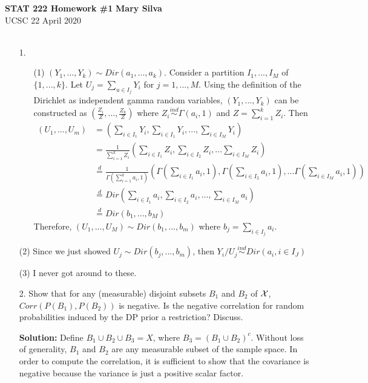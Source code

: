 \documentclass[a4paper, 10pt]{article}
\begin{document}
\noindent
\textbf{STAT 222 Homework \#1} \hfill \textbf{Mary Silva}\\
UCSC \hfill  22 April 2020\\
\\
\begin{enumerate}
    \item[1.] 
    \begin{enumerate}
        \item[(1)] $(Y_1, ..., Y_k) \sim Dir(a_1,..., a_k)$. Consider a partition $I_1,..., I_M$ of $\{1,...,k\}$. Let $U_j = \sum_{u\in I_j} Y_i$ for $j=1,...,M$. Using the definition of the Dirichlet as independent gamma random variables, $(Y_1,..., Y_k)$ can be constructed as $\left( \frac{Z_i}{Z}, ... , \frac{Z_k}{Z}\right)$ where $Z_i \stackrel{ind}{\sim} \Gamma(a_i, 1)$ and $Z = \sum_{i=1}^k Z_i$. Then
        \begin{align*}
            (U_1, ..., U_m) &= \left( \sum_{i \in I_1} Y_i,\sum_{i \in I_1} Y_i, ..., \sum_{i \in I_M} Y_i \right)\\
            &= \frac{1}{\sum_{i=1}^k Z_i} \left(\sum_{i \in I_1} Z_i, \sum_{i \in I_2} Z_i,... \sum_{i \in I_M} Z_i \right)\\
            & \stackrel{d}{=} \frac{1}{\Gamma( \sum_{i=1}^k a_i, 1)}\left(\Gamma\left(\sum_{i\in I_1} a_i, 1\right),\Gamma\left(\sum_{i\in I_2} a_i, 1\right), ... \Gamma\left(\sum_{i\in I_M} a_i, 1\right) \right)\\
            & \stackrel{d}{=} Dir\left( \sum_{i\in I_1} a_i, \sum_{i\in I_2} a_i, ..., \sum_{i\in I_M} a_i\right)\\
            &\stackrel{d}{=} Dir(b_1, ..., b_M)
        \end{align*}
        Therefore, $(U_1,..., U_M) \sim Dir(b_1, ..., b_m)$ where $b_j = \sum_{i\in I_j} a_i$.
    \end{enumerate}
    \item[(2)] Since we just showed $U_j \sim Dir(b_j, ... , b_m)$, then $Y_i/U_j \stackrel{ind}{\sim} Dir(a_i, i\in I_J)$
    \item[(3)] I never got around to these.
    \clearpage
    \item[2.] Show that for any (measurable) disjoint subsets $B_1$ and $B_2$ of $\cal{X}$, $Corr(P(B_1), P(B_2))$ is negative. Is the negative correlation for random probabilities induced by the DP prior a restriction? Discuss.
    
    \textbf{Solution: }
    Define $B_1 \cup B_2 \cup B_3 = X$, where $B_3 = (B_1 \cup B_2)^c$. Without loss of generality, $B_1$ and $B_2$ are any measurable subset of the sample space. In order to compute the correlation, it is sufficient to show that the covariance is negative because the variance is just a positive scalar factor. 
    

\end{enumerate}
\end{document}
